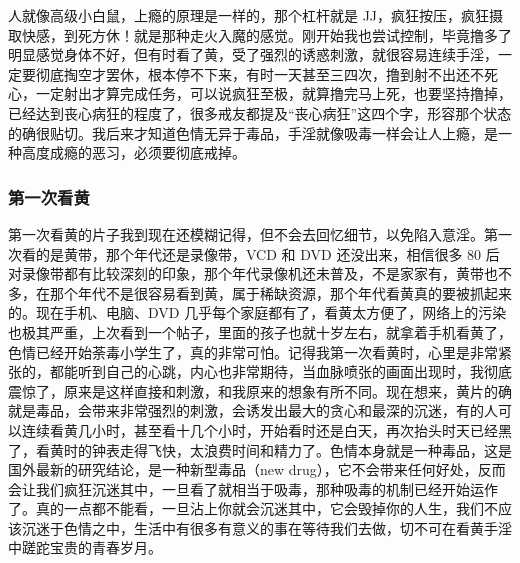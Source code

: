 人就像高级小白鼠，上瘾的原理是一样的，那个杠杆就是 JJ，疯狂按压，疯狂摄取快感，到死方休！就是那种走火入魔的感觉。刚开始我也尝试控制，毕竟撸多了明显感觉身体不好，但有时看了黄，受了强烈的诱惑刺激，就很容易连续手淫，一定要彻底掏空才罢休，根本停不下来，有时一天甚至三四次，撸到射不出还不死心，一定射出才算完成任务，可以说疯狂至极，就算撸完马上死，也要坚持撸掉，已经达到丧心病狂的程度了，很多戒友都提及“丧心病狂”这四个字，形容那个状态的确很贴切。我后来才知道色情无异于毒品，手淫就像吸毒一样会让人上瘾，是一种高度成瘾的恶习，必须要彻底戒掉。

\subsubsection{第一次看黄}

第一次看黄的片子我到现在还模糊记得，但不会去回忆细节，以免陷入意淫。第一次看的是黄带，那个年代还是录像带，VCD 和 DVD 还没出来，相信很多 80 后对录像带都有比较深刻的印象，那个年代录像机还未普及，不是家家有，黄带也不多，在那个年代不是很容易看到黄，属于稀缺资源，那个年代看黄真的要被抓起来的。现在手机、电脑、DVD 几乎每个家庭都有了，看黄太方便了，网络上的污染也极其严重，上次看到一个帖子，里面的孩子也就十岁左右，就拿着手机看黄了，色情已经开始荼毒小学生了，真的非常可怕。记得我第一次看黄时，心里是非常紧张的，都能听到自己的心跳，内心也非常期待，当血脉喷张的画面出现时，我彻底震惊了，原来是这样直接和刺激，和我原来的想象有所不同。现在想来，黄片的确就是毒品，会带来非常强烈的刺激，会诱发出最大的贪心和最深的沉迷，有的人可以连续看黄几小时，甚至看十几个小时，开始看时还是白天，再次抬头时天已经黑了，看黄时的钟表走得飞快，太浪费时间和精力了。色情本身就是一种毒品，这是国外最新的研究结论，是一种新型毒品（new drug），它不会带来任何好处，反而会让我们疯狂沉迷其中，一旦看了就相当于吸毒，那种吸毒的机制已经开始运作了。真的一点都不能看，一旦沾上你就会沉迷其中，它会毁掉你的人生，我们不应该沉迷于色情之中，生活中有很多有意义的事在等待我们去做，切不可在看黄手淫中蹉跎宝贵的青春岁月。

